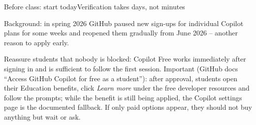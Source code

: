 \documentclass[aspectratio=169,11pt]{beamer}
\begin{document}
\begin{frame}{Before class: start today}{Verification takes days, not minutes}
{  Background: in spring 2026 GitHub paused new sign-ups for individual Copilot plans for some weeks and reopened them gradually from June 2026 -- another reason to apply early.\par
  Reassure students that nobody is blocked: Copilot Free works immediately after signing in and is sufficient to follow the first session. Important (GitHub docs ``Access GitHub Copilot for free as a student''): after approval, students open their Education benefits, click \emph{Learn more} under the free developer resources and follow the prompts; while the benefit is still being applied, the Copilot settings page is the documented fallback. If only paid options appear, they should not buy anything but wait or ask.}
\end{frame}

\end{document}
